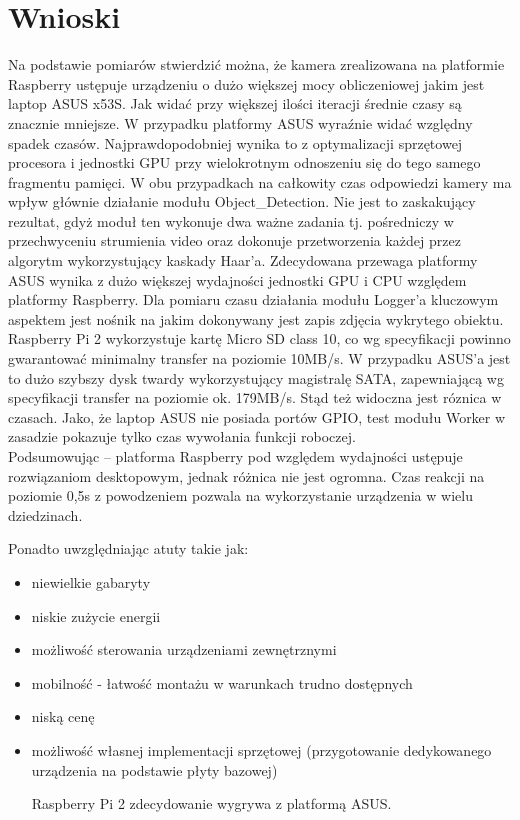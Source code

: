 \section{Wnioski}
Na podstawie pomiarów stwierdzić można, że kamera zrealizowana na platformie Raspberry ustępuje urządzeniu o dużo większej mocy obliczeniowej jakim jest laptop ASUS x53S.
Jak widać przy większej ilości iteracji średnie czasy są znacznie mniejsze. W przypadku platformy ASUS wyraźnie widać względny spadek czasów. Najprawdopodobniej wynika to z optymalizacji sprzętowej procesora i jednostki GPU przy wielokrotnym odnoszeniu się do tego samego fragmentu pamięci.
W obu przypadkach na całkowity czas odpowiedzi kamery ma wpływ głównie działanie modułu Object\_Detection. Nie jest to zaskakujący rezultat, gdyż moduł ten wykonuje dwa ważne zadania tj. pośredniczy w przechwyceniu strumienia video oraz dokonuje przetworzenia każdej przez algorytm wykorzystujący kaskady Haar’a. Zdecydowana przewaga platformy ASUS wynika z dużo większej wydajności jednostki GPU i CPU względem platformy Raspberry. Dla pomiaru czasu działania modułu Logger’a kluczowym aspektem jest nośnik na jakim dokonywany jest zapis zdjęcia wykrytego obiektu. 
Raspberry Pi 2 wykorzystuje kartę Micro SD class 10, co wg specyfikacji powinno gwarantować minimalny transfer na poziomie 10MB/s. W przypadku ASUS’a jest to dużo szybszy dysk twardy wykorzystujący magistralę SATA, zapewniającą wg specyfikacji transfer na poziomie ok. 179MB/s. Stąd też widoczna jest róznica w czasach.
Jako, że laptop ASUS nie posiada portów GPIO, test modułu Worker w zasadzie pokazuje tylko czas wywołania funkcji roboczej.\\
Podsumowując – platforma Raspberry pod względem wydajności ustępuje rozwiązaniom desktopowym, jednak różnica nie jest ogromna. Czas reakcji na poziomie 0,5s z powodzeniem pozwala na wykorzystanie urządzenia w wielu dziedzinach.
\begin{description}
\item Ponadto uwzględniając atuty takie jak:
\begin{itemize}
 \item niewielkie gabaryty
 \item niskie zużycie energii
 \item możliwość sterowania urządzeniami zewnętrznymi 
 \item mobilność - łatwość montażu w warunkach trudno dostępnych
 \item niską cenę
 \item możliwość własnej implementacji sprzętowej (przygotowanie dedykowanego urządzenia na podstawie płyty bazowej)
  
 Raspberry Pi 2 zdecydowanie wygrywa z platformą ASUS.
\end{itemize}
\end{description}

